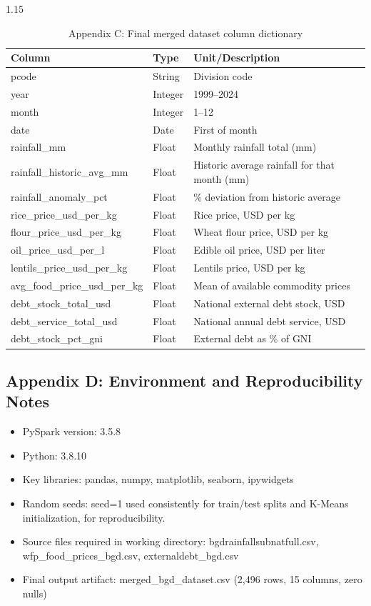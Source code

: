 \documentclass[12pt,a4paper]{article}
\begin{document}
\begin{table}[H]
\centering
\begin{spacing}{1.15}
\caption{Appendix C: Final merged dataset column dictionary}
\label{tab:schema}
\begin{tabularx}{\textwidth}{llX}
\toprule
\textbf{Column} & \textbf{Type} & \textbf{Unit/Description} \\
\midrule
pcode                          & String  & Division code \\
year                           & Integer & 1999--2024 \\
month                          & Integer & 1--12 \\
date                           & Date    & First of month \\
rainfall\_mm                   & Float   & Monthly rainfall total (mm) \\
rainfall\_historic\_avg\_mm    & Float   & Historic average rainfall for that month (mm) \\
rainfall\_anomaly\_pct         & Float   & \% deviation from historic average \\
rice\_price\_usd\_per\_kg      & Float   & Rice price, USD per kg \\
flour\_price\_usd\_per\_kg     & Float   & Wheat flour price, USD per kg \\
oil\_price\_usd\_per\_l        & Float   & Edible oil price, USD per liter \\
lentils\_price\_usd\_per\_kg   & Float   & Lentils price, USD per kg \\
avg\_food\_price\_usd\_per\_kg & Float   & Mean of available commodity prices \\
debt\_stock\_total\_usd        & Float   & National external debt stock, USD \\
debt\_service\_total\_usd      & Float   & National annual debt service, USD \\
debt\_stock\_pct\_gni          & Float   & External debt as \% of GNI \\
\bottomrule
\end{tabularx}
\end{spacing}
\end{table}

\subsection*{Appendix D: Environment and Reproducibility Notes}
\begin{itemize}[leftmargin=2em]
  \item PySpark version: 3.5.8
  \item Python: 3.8.10
  \item Key libraries: pandas, numpy, matplotlib, seaborn, ipywidgets
  \item Random seeds: seed=1 used consistently for train/test splits and K-Means initialization, for reproducibility.
  \item Source files required in working directory: bgdrainfallsubnatfull.csv, wfp_food_prices_bgd.csv, externaldebt_bgd.csv
  \item Final output artifact: merged_bgd_dataset.csv (2,496 rows, 15 columns, zero nulls)
\end{itemize}
\end{document}
